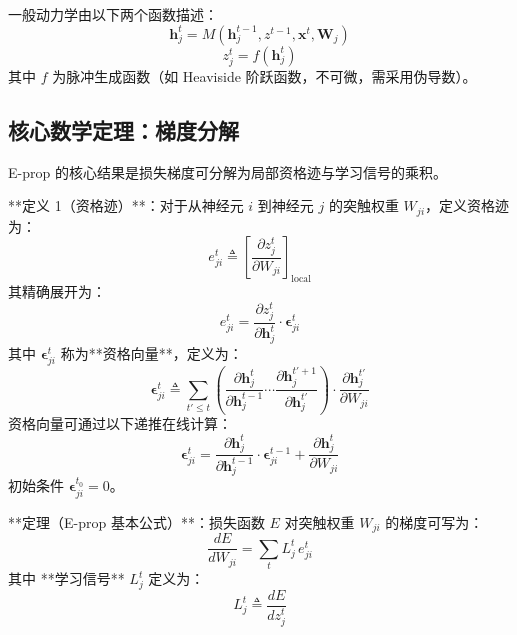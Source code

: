 \documentclass{article}
\begin{document}
一般动力学由以下两个函数描述：
\begin{equation}
\mathbf{h}_j^t = M(\mathbf{h}_j^{t-1}, z^{t-1}, \mathbf{x}^t, \mathbf{W}_j)
\label{eq:eprop_hidden}
\end{equation}
\begin{equation}
z_j^t = f(\mathbf{h}_j^t)
\label{eq:eprop_spike}
\end{equation}
其中 $f$ 为脉冲生成函数（如 Heaviside 阶跃函数，不可微，需采用伪导数）。

\subsection{核心数学定理：梯度分解}

E-prop 的核心结果是损失梯度可分解为局部资格迹与学习信号的乘积。

**定义 1（资格迹）**：对于从神经元 $i$ 到神经元 $j$ 的突触权重 $W_{ji}$，定义资格迹为：
\begin{equation}
\boxed{
e_{ji}^t \triangleq \left[ \frac{\partial z_j^t}{\partial W_{ji}} \right]_{\text{local}}
}
\label{eq:eprop_e_def}
\end{equation}
其精确展开为：
\begin{equation}
\boxed{
e_{ji}^t = \frac{\partial z_j^t}{\partial \mathbf{h}_j^t} \cdot \boldsymbol{\epsilon}_{ji}^t
}
\label{eq:eprop_e_expand}
\end{equation}
其中 $\boldsymbol{\epsilon}_{ji}^t$ 称为**资格向量**，定义为：
\begin{equation}
\boxed{
\boldsymbol{\epsilon}_{ji}^t \triangleq 
\sum_{t' \le t} 
\left( \frac{\partial \mathbf{h}_j^t}{\partial \mathbf{h}_j^{t-1}} \cdots \frac{\partial \mathbf{h}_j^{t'+1}}{\partial \mathbf{h}_j^{t'}} \right)
\cdot
\frac{\partial \mathbf{h}_j^{t'}}{\partial W_{ji}}
}
\label{eq:eprop_epsilon_def}
\end{equation}
资格向量可通过以下递推在线计算：
\begin{equation}
\boxed{
\boldsymbol{\epsilon}_{ji}^t = 
\frac{\partial \mathbf{h}_j^t}{\partial \mathbf{h}_j^{t-1}} \cdot \boldsymbol{\epsilon}_{ji}^{t-1}
+
\frac{\partial \mathbf{h}_j^t}{\partial W_{ji}}
}
\label{eq:eprop_epsilon_rec}
\end{equation}
初始条件 $\boldsymbol{\epsilon}_{ji}^{t_0} = 0$。

**定理（E-prop 基本公式）**：损失函数 $E$ 对突触权重 $W_{ji}$ 的梯度可写为：
\begin{equation}
\boxed{
\frac{dE}{dW_{ji}} = \sum_{t} L_j^t \, e_{ji}^t
}
\label{eq:eprop_theorem}
\end{equation}
其中 **学习信号** $L_j^t$ 定义为：
\begin{equation}
\boxed{
L_j^t \triangleq \frac{dE}{d z_j^t}
}
\label{eq:eprop_L_def}
\end{equation}
\end{document}
